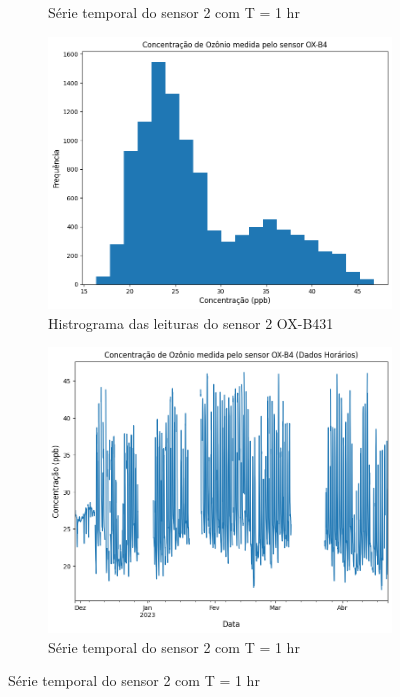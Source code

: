 \begin{figure}[h]
\begin{subfigure}{0.495\textwidth}
        \caption{Série temporal do sensor 2 com T = 1 hr}
        \label{fig:data-o3-1-preproc-1HR}
    \end{subfigure}
    \begin{subfigure}{0.495\textwidth}
        \includegraphics[width=\textwidth]{chapters/3-RESULTADOS CAMPO/Figuras/preproc-hist-ox-b4-2.png}
        \caption{Histrograma das leituras do sensor 2 OX-B431}
        \label{fig:data-o3-2-preproc-hist}
    \end{subfigure}
    \hfill
    \begin{subfigure}{0.495\textwidth}
        \includegraphics[width=\textwidth]{chapters/3-RESULTADOS CAMPO/Figuras/preproc-1HR-ox-b4-2.png}
        \caption{Série temporal do sensor 2 com T = 1 hr}
        \label{fig:data-o3-2-preproc-1HR}
    \end{subfigure}
\end{figure}

